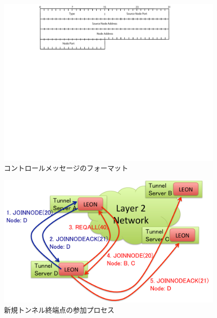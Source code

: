 \begin{figure}[h]
	\begin{center}
		\includegraphics[scale=1.0]{./img/controlmessage}
		\caption{コントロールメッセージのフォーマット}
		\label{img:controlheader}
	\end{center}
\end{figure}

\begin{figure}
	\begin{center}
		\includegraphics[scale=0.60]{./img/joinnodeproc}
		\caption{新規トンネル終端点の参加プロセス}
		\label{img:joinnodeproc}
	\end{center}
\end{figure}

